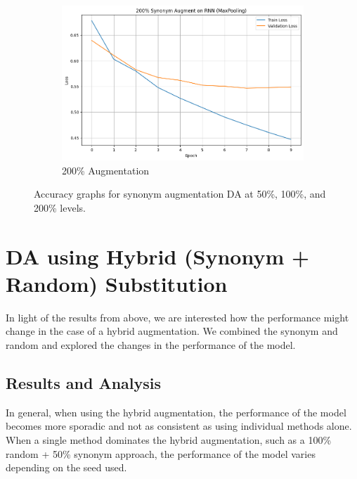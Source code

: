 \documentclass[10pt]{extarticle}
\begin{document}
\begin{figure}[ht]
\begin{subfigure}[b]{0.3\textwidth}
    \includegraphics[width=\textwidth]{img/synonym_200.png}
    \caption{200\% Augmentation}
    \label{fig:synonym_200}
  \end{subfigure}
  \caption{Accuracy graphs for synonym augmentation DA at 50\%, 100\%, and 200\% levels.}
  \label{fig:synonym_extreme_substitution_acc}
\end{figure}

\section{DA using Hybrid (Synonym + Random) Substitution}

In light of the results from above, we are interested how the performance might
change in the case of a hybrid augmentation. We combined the synonym and random
and explored the changes in the performance of the model.

\subsection{Results and Analysis}

In general, when using the hybrid augmentation, the performance of the model
becomes more sporadic and not as consistent as using individual methods alone.
When a single method dominates the hybrid augmentation, such as a 100\% random
+ 50\% synonym approach, the performance of the model varies depending on the
seed used.
\end{document}
